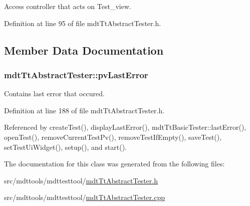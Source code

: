 Access controller that acts on Test\-\_\-view. 



Definition at line 95 of file mdt\-Tt\-Abstract\-Tester.\-h.



\subsection{Member Data Documentation}
\hypertarget{classmdt_tt_abstract_tester_a99947ad3028815b144027beb8a8496ef}{
\subsubsection[{pv\-Last\-Error}]{ mdt\-Tt\-Abstract\-Tester\-::pv\-Last\-Error\hspace{0.3cm}{\ttfamily [protected]}}}\label{classmdt_tt_abstract_tester_a99947ad3028815b144027beb8a8496ef}


Contains last error that occured. 



Definition at line 188 of file mdt\-Tt\-Abstract\-Tester.\-h.



Referenced by create\-Test(), display\-Last\-Error(), mdt\-Tt\-Basic\-Tester\-::last\-Error(), open\-Test(), remove\-Current\-Test\-Pv(), remove\-Test\-If\-Empty(), save\-Test(), set\-Test\-Ui\-Widget(), setup(), and start().



The documentation for this class was generated from the following files\-:\begin{DoxyCompactItemize}
\item 
src/mdttools/mdttesttool/\hyperlink{mdt_tt_abstract_tester_8h}{mdt\-Tt\-Abstract\-Tester.\-h}\item 
src/mdttools/mdttesttool/\hyperlink{mdt_tt_abstract_tester_8cpp}{mdt\-Tt\-Abstract\-Tester.\-cpp}\end{DoxyCompactItemize}
